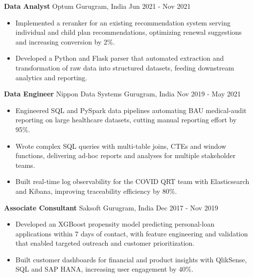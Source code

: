 \documentclass[10pt,a4paper]{article}
\newcommand{\role}[4]{\textbf{#1} \textbar{} #2 \hfill #3 \textbar{} #4\par}
\begin{document}
\vspace{3pt}
\role{Data Analyst}{Optum}{Gurugram, India}{Jun 2021 - Nov 2021}
\begin{itemize}
  \item Implemented a reranker for an existing recommendation system serving individual and child plan recommendations, optimizing renewal suggestions and increasing conversion by 2\%.
  \item Developed a Python and Flask parser that automated extraction and transformation of raw data into structured datasets, feeding downstream analytics and reporting.
\end{itemize}
\vspace{3pt}
\role{Data Engineer}{Nippon Data Systems}{Gurugram, India}{Nov 2019 - May 2021}
\begin{itemize}
  \item Engineered SQL and PySpark data pipelines automating BAU medical-audit reporting on large healthcare datasets, cutting manual reporting effort by 95\%.
  \item Wrote complex SQL queries with multi-table joins, CTEs and window functions, delivering ad-hoc reports and analyses for multiple stakeholder teams.
  \item Built real-time log observability for the COVID QRT team with Elasticsearch and Kibana, improving traceability efficiency by 80\%.
\end{itemize}
\vspace{3pt}
\role{Associate Consultant}{Saksoft}{Gurugram, India}{Dec 2017 - Nov 2019}
\begin{itemize}
  \item Developed an XGBoost propensity model predicting personal-loan applications within 7 days of contact, with feature engineering and validation that enabled targeted outreach and customer prioritization.
  \item Built customer dashboards for financial and product insights with QlikSense, SQL and SAP HANA, increasing user engagement by 40\%.
\end{itemize}
\end{document}
